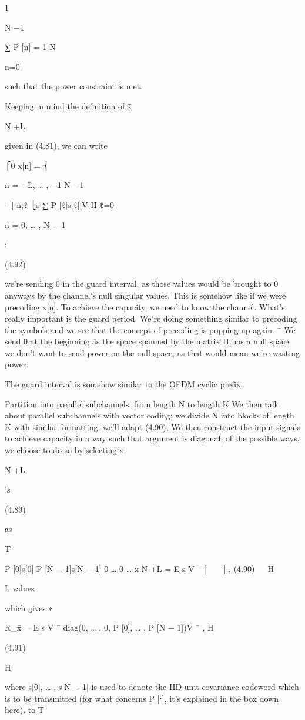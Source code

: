 {{{{{1

N −1

∑ P [n] = 1 N

n=0

such that the power constraint is met.

Keeping in mind the definition of x̄

N +L

given in (4.81), we can write

⎧0 x[n] = ⎨

n = −L, … , −1 N −1

¯ ] n,ℓ
⎩\sqrtE s ∑ \sqrt P [ℓ]s[ℓ][V H ℓ=0

n = 0, … , N − 1

:

(4.92)

we're sending 0 in the guard interval, as those values would be brought to 0 anyways by the channel's null singular values. This is somehow like if we were precoding x[n].
To achieve the capacity, we need to know the channel. What's really important is the guard period. We're doing something similar to precoding the symbols and we see that the concept of precoding is popping up again.
¯
We send 0 at the beginning as the space spanned by the matrix H has a null space: we don't want to send power on the null space, as that would mean we're wasting power.

The guard interval is somehow similar to the OFDM cyclic prefix.

Partition into parallel subchannels: from length N to length K We then talk about parallel subchannels with vector coding; we divide N into blocks of length K with similar formatting: we'll adapt (4.90),
We then construct the input signals to achieve capacity in a way such that argument is diagonal; of the possible ways, we choose to do so by selecting x̄

N +L

's

(4.89)

as

T

\sqrt P [0]s[0]
\sqrt P [N − 1]s[N − 1]
0 … 0
…
x̄ N +L = \sqrt E s V ¯ [  
]
,
(4.90)


H

L values

which gives
∗

R_x̄ = E s V ¯ diag(0, … , 0, P [0], … , P [N − 1])V ¯ ,
H

(4.91)

H

where s[0], … , s[N − 1] is used to denote the IID unit-covariance codeword which is to be transmitted (for what concerns P [⋅], it's explained in the box down here).
to T

}}}}}
